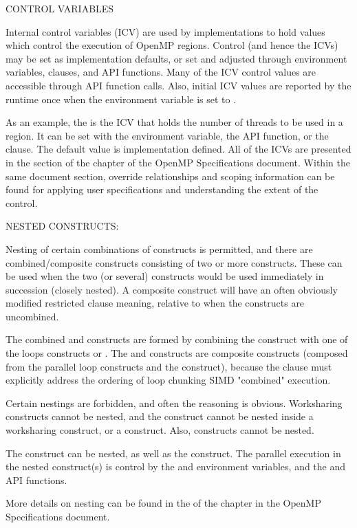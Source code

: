 CONTROL VARIABLES 

  Internal control variables (ICV) are used by implementations to hold values which control the execution
  of OpenMP regions.  Control (and hence the ICVs) may be set as implementation defaults, 
  or set and adjusted through environment variables, clauses, and API functions.  Many of the ICV control
  values are accessible through API function calls.  Also, initial ICV values are reported by the runtime
  once when the  environment variable is set to . 

  As an example, the  is the ICV that holds the number of threads
  to be used in a  region.  It can be set with the  environment variable, 
  the  API function, or the  clause.  The default 
  value is implementation defined.  All of the ICVs are presented in the  section
  of the  chapter of the OpenMP Specifications document.  Within the same document section, override 
  relationships and scoping information can be found for applying user specifications and understanding the 
  extent of the control.

NESTED CONSTRUCTS:

Nesting of certain combinations of constructs is permitted, and there are combined/composite constructs
consisting of two or more constructs.  These can be used when the two (or several) constructs would be used
immediately in succession (closely nested).  A composite construct will have an often obviously modified
restricted clause meaning, relative to when the constructs are uncombined. %

The combined  and  constructs are formed by combining the 
construct with one of the loops constructs  or .  The
 and  constructs are composite constructs (composed from
the parallel loop constructs and the  construct), because the  clause must
explicitly address the ordering of loop chunking  SIMD "combined" execution.

Certain nestings are forbidden, and often the reasoning is obvious.  Worksharing constructs cannot be nested, and
the  construct cannot be nested inside a worksharing construct, or a  construct. 
Also,  constructs cannot be nested.  

The  construct can be nested, as well as the  construct.  The parallel
execution in the nested  construct(s) is control by the  and 
 environment variables, and the  and 
 API functions.

More details on nesting can be found in the  of the  
chapter in the OpenMP Specifications document.
